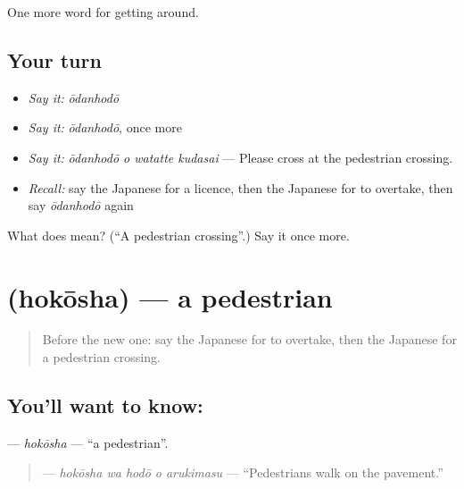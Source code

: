 \begin{grammarlens}[title={What you've built}]
One more word for getting around.
\end{grammarlens}

\subsection*{Your turn}
\begin{itemize}
\raggedright
  \item \emph{Say it:} \emph{ōdanhodō}
  \item \emph{Say it:} \emph{ōdanhodō}, once more
  \item \emph{Say it:} \emph{ōdanhodō o watatte kudasai} — Please cross at the pedestrian crossing.
  \item \emph{Recall:} say the Japanese for a licence, then the Japanese for to overtake, then say \emph{ōdanhodō} again
\end{itemize}

\begin{tcolorbox}[breakable,colback=teal!4,colframe=teal!35!black,title={Before you move on}]
What does  mean? (\textquotedblleft{}A pedestrian crossing\textquotedblright{}.) Say it once more.
\end{tcolorbox}
\section[\texorpdfstring{\ja{ほこうしゃ} (hokōsha)}{ほこうしゃ (hokōsha)}]{ (hokōsha) — a pedestrian}

\label{lesson:JA-C391-hokousha}



\begin{quote}
Before the new one: say the Japanese for to overtake, then the Japanese for a pedestrian crossing.
\end{quote}

\subsection*{You'll want to know: }
\textbf{} — \emph{hokōsha} — \textquotedblleft{}a pedestrian\textquotedblright{}.

\begin{quote}
\textbf{  } — \emph{hokōsha wa hodō o arukimasu} — \textquotedblleft{}Pedestrians walk on the pavement.\textquotedblright{}
\end{quote}

